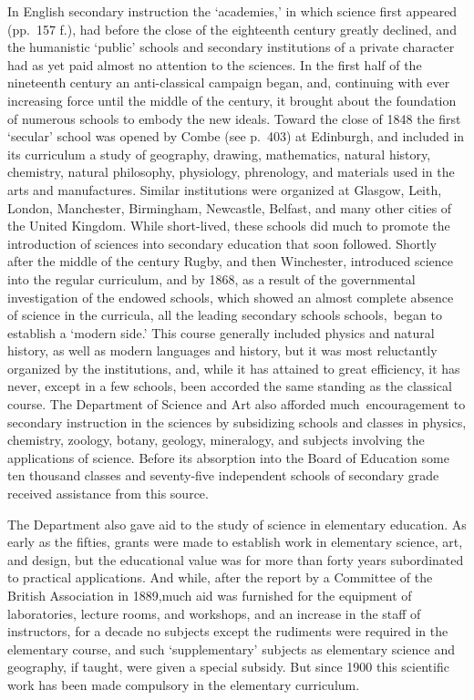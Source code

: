 \documentclass[
]{book}
\begin{document}
In English secondary instruction the `academies,' in which science first appeared (pp.~157 f.), had before the close of the eighteenth century greatly declined, and the humanistic `public' schools and secondary institutions of a private character had as yet paid almost no attention to the sciences. In the first half of the nineteenth century an anti-classical campaign began, and, continuing with ever increasing force until the middle of the century, it brought about the foundation of numerous schools to embody the new ideals. Toward the close of 1848 the first `secular' school was opened by Combe (see p.~403) at Edinburgh, and included in its curriculum a study of geography, drawing, mathematics, natural history, chemistry, natural philosophy, physiology, phrenology, and materials used in the arts and manufactures. Similar institutions were organized at Glasgow, Leith, London, Manchester, Birmingham, Newcastle, Belfast, and many other cities of the United Kingdom. While short-lived, these schools did much to promote the introduction of sciences into secondary education that soon followed. Shortly after the middle of the century Rugby, and then Winchester, introduced science into the regular curriculum, and by 1868, as a result of the governmental investigation of the endowed schools, which showed an almost complete absence of science in the curricula, all the leading secondary schools schools,~began to establish a `modern side.' This course generally included physics and natural history, as well as modern languages and history, but it was most reluctantly organized by the institutions, and, while it has attained to great efficiency, it has never, except in a few schools, been accorded the same standing as the classical course. The Department of Science and Art also afforded much~encouragement to secondary instruction in the sciences by subsidizing schools and classes in physics, chemistry, zoology, botany, geology, mineralogy, and subjects involving the applications of science. Before its absorption into the Board of Education some ten thousand classes and seventy-five independent schools of secondary grade received assistance from this source.

The Department also gave aid to the study of science in elementary education. As early as the fifties, grants were made to establish work in elementary science, art, and design, but the educational value was for more than forty years subordinated to practical applications. And while, after the report by a Committee of the British Association in 1889,much aid was furnished for the equipment of laboratories, lecture rooms, and workshops, and an increase in the staff of instructors, for a decade no subjects except the rudiments were required in the elementary course, and such `supplementary' subjects as elementary science and geography, if taught, were given a special subsidy. But since 1900 this scientific work has been made compulsory in the elementary curriculum.
\end{document}

